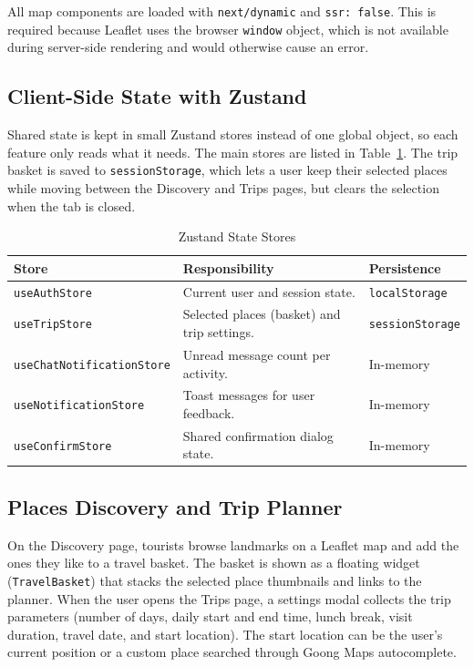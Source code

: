 \documentclass[a4paper,12pt]{report}
\begin{document}
All map components are loaded with \texttt{next/dynamic} and \texttt{ssr: false}. This is required because Leaflet uses the browser \texttt{window} object, which is not available during server-side rendering and would otherwise cause an error.

\subsection{Client-Side State with Zustand}

Shared state is kept in small Zustand stores instead of one global object, so each feature only reads what it needs. The main stores are listed in Table~\ref{tab:zustand_stores}. The trip basket is saved to \texttt{sessionStorage}, which lets a user keep their selected places while moving between the Discovery and Trips pages, but clears the selection when the tab is closed.

\begin{table}[H]
\centering
\small
\renewcommand{\arraystretch}{1.2}
\begin{tabular}{|p{4.5cm}|p{6.0cm}|p{2.8cm}|}
\hline
\textbf{Store} & \textbf{Responsibility} & \textbf{Persistence} \\ \hline
\texttt{use\allowbreak Auth\allowbreak Store} & Current user and session state. & \texttt{local\allowbreak Storage} \\ \hline
\texttt{use\allowbreak Trip\allowbreak Store} & Selected places (basket) and trip settings. & \texttt{session\allowbreak Storage} \\ \hline
\texttt{use\allowbreak Chat\allowbreak Notification\allowbreak Store} & Unread message count per activity. & In-memory \\ \hline
\texttt{use\allowbreak Notification\allowbreak Store} & Toast messages for user feedback. & In-memory \\ \hline
\texttt{use\allowbreak Confirm\allowbreak Store} & Shared confirmation dialog state. & In-memory \\ \hline
\end{tabular}
\caption{Zustand State Stores}
\label{tab:zustand_stores}
\end{table}

\subsection{Places Discovery and Trip Planner}

On the Discovery page, tourists browse landmarks on a Leaflet map and add the ones they like to a travel basket. The basket is shown as a floating widget (\texttt{TravelBasket}) that stacks the selected place thumbnails and links to the planner. When the user opens the Trips page, a settings modal collects the trip parameters (number of days, daily start and end time, lunch break, visit duration, travel date, and start location). The start location can be the user's current position or a custom place searched through Goong Maps autocomplete.
\end{document}
